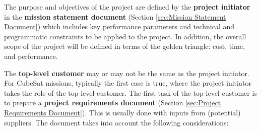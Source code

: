 The purpose and objectives of the project are defined by the \textbf{project initiator} in the \textbf{mission statement document} (Section \ref{sec:Mission Statement Document}) which includes key performance parameters and technical and programmatic constraints to be applied to the project. In addition, the overall scope of the project will be defined in terms of the golden triangle: cost, time, and performance.

The \textbf{top-level customer} may or may not be the same as the project initiator. For CubeSat missions, typically the first case is true, where the project initiator takes the role of the top-level customer. The first task of the top-level customer is to prepare a \textbf{project requirements document} (Section \ref{sec:Project Requirements Document}). This is usually done with inputs from (potential) suppliers. The document takes into account the following considerations:

